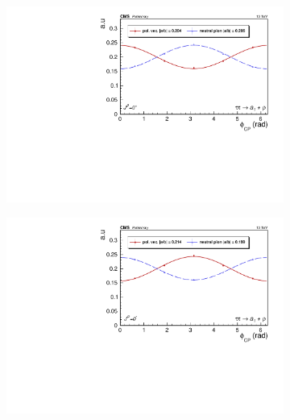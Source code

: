 \begin{figure}[]
    \begin{subfigure}[b]{0.5\linewidth}
    \centering
    \includegraphics[width=\linewidth]{Chapitre6/Images/A1RHO/A1RHO_even_reco.pdf} 
    \caption*{} 
    \vspace{10mm}
  \end{subfigure}%
  \begin{subfigure}[b]{0.5\linewidth}
    \centering
    \includegraphics[width=\linewidth]{Chapitre6/Images/A1RHO/A1RHO_odd_reco.pdf} 
    \caption*{} 
    \vspace{10mm}
  \end{subfigure} 


\end{figure}
